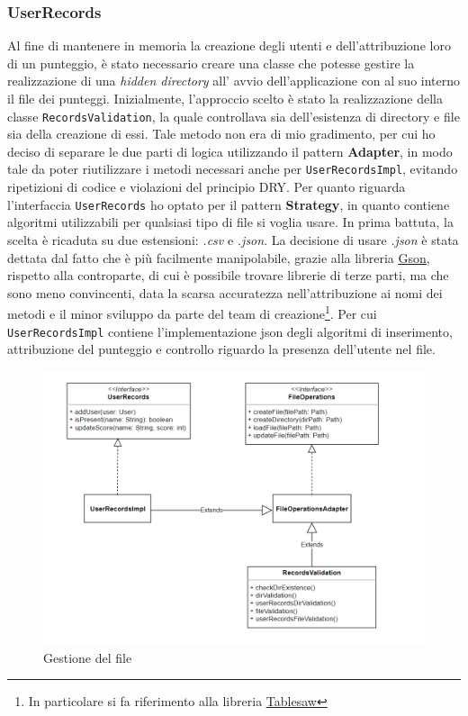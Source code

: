 \documentclass[a4paper,12pt]{report}
\begin{document}
\subsubsection{UserRecords}
Al fine di mantenere in memoria la creazione degli utenti e dell'attribuzione loro di un punteggio, è stato necessario creare una classe che potesse gestire la realizzazione di una \textit{hidden directory} all' avvio dell'applicazione con al suo interno il file dei punteggi. Inizialmente, l'approccio scelto è stato la realizzazione della classe \texttt{RecordsValidation}, la quale controllava sia dell'esistenza di directory e file sia della creazione di essi. Tale metodo non era di mio gradimento, per cui ho deciso di separare le due parti di logica utilizzando il pattern \textbf{Adapter}, in modo tale da poter riutilizzare i metodi necessari anche per \texttt{UserRecordsImpl}, evitando ripetizioni di codice e violazioni del principio DRY. Per quanto riguarda l'interfaccia \texttt{UserRecords} ho optato per il pattern \textbf{Strategy}, in quanto contiene algoritmi utilizzabili per qualsiasi tipo di file si voglia usare. In prima battuta, la scelta è ricaduta su due estensioni: \textit{.csv} e \textit{.json}. La decisione di usare \textit{.json} è stata dettata dal fatto che è più facilmente manipolabile, grazie alla libreria \href{https://github.com/google/gson}{\underline{Gson}}, rispetto alla controparte, di cui è possibile trovare librerie di terze parti, ma che sono meno convincenti, data la scarsa accuratezza nell'attribuzione ai nomi dei metodi e il minor sviluppo da parte del team di creazione\footnote{In particolare si fa riferimento alla libreria \href{https://github.com/jtablesaw/tablesaw}{\underline{Tablesaw}}}. Per cui \texttt{UserRecordsImpl} contiene l'implementazione json degli algoritmi di inserimento, attribuzione del punteggio e controllo riguardo la presenza dell'utente nel file.
\begin{figure}[H]
    \begin{center}
        \centering
        \includegraphics[width=\textwidth]{img/Design/Severi/Records.png}
    \end{center}
    \caption{Gestione del file}
    \label{img:records}
\end{figure}
\end{document}
